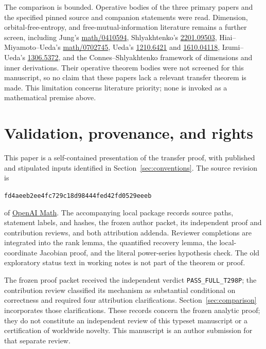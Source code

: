 \documentclass[11pt]{article}
\theoremstyle{definition}\newtheorem{definition}[theorem]{Definition}
\theoremstyle{remark}\newtheorem{remark}[theorem]{Remark}
\newcommand{\pin}{\texttt{fd4aeeb2ee4fc729c18d98444fed42fd0529eeeb}}
\begin{document}
The comparison is bounded. Operative bodies of the three primary
papers \cite{Shly,NSSentropy,NSSfisher} and the specified pinned source
and companion statements were read. Dimension, orbital-free-entropy,
and free-mutual-information literature remains a further screen,
including Jung's \href{https://arxiv.org/abs/math/0410594}{math/0410594},
Shlyakhtenko's \href{https://arxiv.org/abs/2201.09503}{2201.09503},
Hiai--Miyamoto--Ueda's
\href{https://arxiv.org/abs/math/0702745}{math/0702745}, Ueda's
\href{https://arxiv.org/abs/1210.6421}{1210.6421} and
\href{https://arxiv.org/abs/1610.04118}{1610.04118},
Izumi--Ueda's \href{https://arxiv.org/abs/1306.5372}{1306.5372}, and the
Connes--Shlyakhtenko framework of dimensions and inner derivations. Their
operative theorem bodies were not screened for this manuscript, so
no claim that these papers lack a relevant transfer theorem is made.
This limitation concerns literature priority; none is invoked as a
mathematical premise above.

\appendix
\section{Validation, provenance, and rights}
\label{app:provenance}
This paper is a self-contained presentation of the transfer proof,
with published and stipulated inputs identified in
Section~\ref{sec:conventions}. The source revision is
\begin{center}\small\pin\end{center}
of \href{https://github.com/openai/math}{OpenAI Math}.
The accompanying local package records source paths, statement labels,
and hashes, the frozen author packet, its independent proof and
contribution reviews, and both attribution addenda. Reviewer completions
are integrated into the rank lemma, the quantified recovery lemma,
the local-coordinate Jacobian proof, and the literal power-series
hypothesis check. The old exploratory status text in working notes
is not part of the theorem or proof.

The frozen proof packet received the independent verdict
\texttt{PASS\_FULL\_T298P}; the contribution review classified its
mechanism as substantial conditional on correctness and required four
attribution clarifications. Section~\ref{sec:comparison} incorporates
those clarifications. These records concern the frozen analytic proof;
they do not constitute an independent review of this typeset manuscript
or a certification of worldwide novelty. This manuscript is an author
submission for that separate review.
\end{document}
